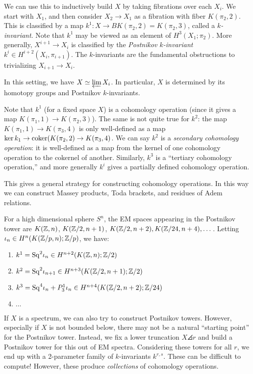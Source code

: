 \documentclass{article}
\begin{document}
We can use this to inductively build $X$ by taking fibrations over each $X_i$.
We start with $X_1$, and then consider $X_2 \to X_1$ as a fibration with fiber $K(\pi_2, 2)$.
This is classified by a map $k^1: X \to BK(\pi_2, 2) = K(\pi_2, 3)$, called a \emph{$k$-invariant}.
Note that $k^1$ may be viewed as an element of $H^3(X_1; \pi_2)$.
More generally, $X^{i+1} \to X_i$ is classified by the \emph{Postnikov $k$-invariant} $k^i \in H^{i+2}(X_i, \pi_{i+1})$.
The $k$-invariants are the fundamental obstructions to trivializing $X_{i+1} \to X_i$.

\begin{thm}
	In this setting, we have $X \simeq \varprojlim X_i$.
	In particular, $X$ is determined by its homotopy groups and Postnikov $k$-invariants.
\end{thm}

Note that $k^1$ (for a fixed space $X$) is a cohomology operation (since it gives a map $K(\pi_1, 1) \to K(\pi_2, 3)$).
The same is not quite true for $k^2$: the map $K(\pi_1, 1) \to K(\pi_3, 4)$ is only well-defined as a map $\ker k_1 \to \operatorname{coker}(K(\pi_2, 2) \to K(\pi_3, 4)$.
We can say $k^2$ is a \emph{secondary cohomology operation}: it is well-defined as a map from the kernel of one cohomology operation to the cokernel of another.
Similarly, $k^3$ is a ``tertiary cohomology operation,'' and more generally $k^i$ gives a partially defined cohomology operation.

This gives a general strategy for constructing cohomology operations.
In this way we can construct Massey products, Toda brackets, and residues of Adem relations.

\begin{ex}
	For a high dimensional sphere $S^n$, the EM spaces appearing in the Postnikov tower are $K(\mathbb{Z}, n)$, $K(\mathbb{Z}/2, n+1)$, $K(\mathbb{Z}/2, n+2), K(\mathbb{Z}/24, n+4), \dots$.
	Letting $\iota_n \in H^n(K(\mathbb{Z}/p, n); \mathbb{Z}/p)$, we have:
	\begin{enumerate}
		\item $k^1 = \mathrm{Sq}^2 \iota_n \in H^{n+2}(K(\mathbb{Z}, n); \mathbb{Z}/2)$
		\item $k^2 = \mathrm{Sq}^2 \iota_{n+1} \in H^{n+3}(K(\mathbb{Z}/2, n+1); \mathbb{Z}/2)$
		\item $k^3 = \mathrm{Sq}^4 \iota_n + P_3^1 \iota_n \in H^{n+4}(K(\mathbb{Z}/2, n+2); \mathbb{Z}/24)$
		\item $\dots$
	\end{enumerate}
\end{ex}

If $X$ is a spectrum, we can also try to construct Postnikov towers.
However, especially if $X$ is not bounded below, there may not be a natural ``starting point'' for the Postnikov tower.
Instead, we fix a lower truncation $X\angles{r}$ and build a Postnikov tower for this out of EM spectra.
Considering these towers for all $r$, we end up with a 2-parameter family of $k$-invariants $k^{r,s}$.
These can be difficult to compute!
However, these produce \emph{collections} of cohomology operations.
\end{document}
